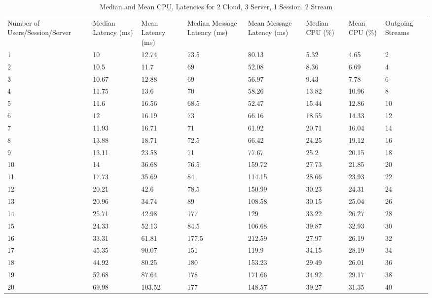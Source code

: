 \begin{table}
\caption{Median and Mean CPU, Latencies for 2 Cloud, 3 Server, 1 Session, 2 Stream}
\label{table:2cld_3serv_1sess_2str}
\begin{tabu} to\linewidth{|X[c]|X[c]|X[c]|X[c]|X[c]|X[c]|X[c]|X[c]|}
\everyrow{\hline}
\hline
Number of Users/Session/Server & Median Latency (ms) & Mean Latency (ms) & Median Message Latency (ms) & Mean Message Latency (ms) & Median CPU (\%) & Mean CPU (\%) & Outgoing Streams\\
1 & 10 & 12.74 & 73.5 & 80.13 & 5.32 & 4.65 & 2 \\
2 & 10.5 & 11.7 & 69 & 52.08 & 8.36 & 6.69 & 4 \\
3 & 10.67 & 12.88 & 69 & 56.97 & 9.43 & 7.78 & 6 \\
4 & 11.75 & 13.6 & 70 & 58.26 & 13.82 & 10.96 & 8 \\
5 & 11.6 & 16.56 & 68.5 & 52.47 & 15.44 & 12.86 & 10 \\
6 & 12 & 16.19 & 73 & 66.16 & 18.55 & 14.33 & 12 \\
7 & 11.93 & 16.71 & 71 & 61.92 & 20.71 & 16.04 & 14 \\
8 & 13.88 & 18.71 & 72.5 & 66.42 & 24.25 & 19.12 & 16 \\
9 & 13.11 & 23.58 & 71 & 77.67 & 25.2 & 20.15 & 18 \\
10 & 14 & 36.68 & 76.5 & 159.72 & 27.73 & 21.85 & 20 \\
11 & 17.73 & 35.69 & 84 & 114.15 & 28.66 & 23.93 & 22 \\
12 & 20.21 & 42.6 & 78.5 & 150.99 & 30.23 & 24.31 & 24 \\
13 & 20.96 & 34.74 & 89 & 108.58 & 30.15 & 25.04 & 26 \\
14 & 25.71 & 42.98 & 177 & 129 & 33.22 & 26.27 & 28 \\
15 & 24.33 & 52.13 & 84.5 & 106.68 & 39.87 & 32.93 & 30 \\
16 & 33.31 & 61.81 & 177.5 & 212.59 & 27.97 & 26.19 & 32 \\
17 & 45.35 & 90.07 & 151 & 119.9 & 34.15 & 28.19 & 34 \\
18 & 44.92 & 80.25 & 180 & 153.23 & 29.49 & 26.01 & 36 \\
19 & 52.68 & 87.64 & 178 & 171.66 & 34.92 & 29.17 & 38 \\
20 & 69.98 & 103.52 & 177 & 148.57 & 39.27 & 31.35 & 40 \\
\end{tabu}
\end{table}

